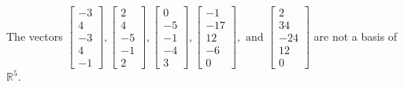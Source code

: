 \begin{exercise}
\begin{exerciseStatement}
  \end{exerciseStatement}
  \begin{exerciseAnswer}
   The vectors \(\left[\begin{array}{r}
-3 \\
4 \\
-3 \\
4 \\
-1
\end{array}\right] , \left[\begin{array}{r}
2 \\
4 \\
-5 \\
-1 \\
2
\end{array}\right] , \left[\begin{array}{r}
0 \\
-5 \\
-1 \\
-4 \\
3
\end{array}\right] , \left[\begin{array}{r}
-1 \\
-17 \\
12 \\
-6 \\
0
\end{array}\right] , \text{ and } \left[\begin{array}{r}
2 \\
34 \\
-24 \\
12 \\
0
\end{array}\right]\) 
  	 are not  a basis of \(\mathbb{R}^5\).
  


  \end{exerciseAnswer}
\end{exercise}